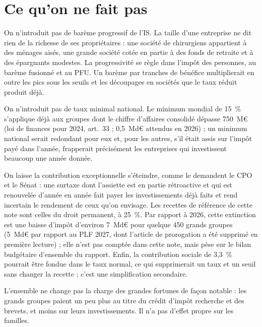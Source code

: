 \documentclass[11pt,a4paper]{article}
\begin{document}
\section{Ce qu'on ne fait pas}

On n'introduit pas de barème progressif de l'IS. La taille d'une entreprise ne dit rien de la richesse de
ses propriétaires : une société de chirurgiens appartient à des ménages aisés, une grande société cotée en
partie à des fonds de retraite et à des épargnants modestes. La progressivité se règle dans l'impôt des
personnes, au barème fusionné et au PFU. Un barème par tranches de bénéfice multiplierait en outre les pics
sous les seuils et les découpages en sociétés que le taux réduit produit déjà.

On n'introduit pas de taux minimal national. Le minimum mondial de 15~\% s'applique déjà aux groupes dont
le chiffre d'affaires consolidé dépasse 750~M€ (loi de finances pour 2024, art.~33 ; 0,5~Md€ attendus en
2026) ; un minimum national serait redondant pour eux et, pour les autres, s'il était assis sur l'impôt payé
dans l'année, frapperait précisément les entreprises qui investissent beaucoup une année donnée.

On laisse la contribution exceptionnelle s'éteindre, comme le demandent le CPO et le Sénat : une surtaxe
dont l'assiette est en partie rétroactive et qui est renouvelée d'année en année fait payer les
investissements déjà faits et rend incertain le rendement de ceux qu'on envisage. Les recettes de référence
de cette note sont celles du droit permanent, à 25~\%. Par rapport à 2026, cette extinction est une baisse
d'impôt d'environ 7~Md€ pour quelque 450 grands groupes (5~Md€ par rapport au PLF 2027, dont l'article de
prorogation a été supprimé en première lecture) ; elle n'est pas comptée dans cette note, mais pèse sur le
bilan budgétaire d'ensemble du rapport. Enfin, la contribution sociale de 3,3~\% pourrait être
fondue dans le taux normal, ce qui supprimerait un taux et un seuil sans changer la recette ; c'est une
simplification secondaire.

L'ensemble ne change pas la charge des grandes fortunes de façon notable : les grands groupes paient un peu
plus au titre du crédit d'impôt recherche et des brevets, et moins sur leurs investissements. Il n'a pas
d'effet propre sur les familles.
\end{document}
